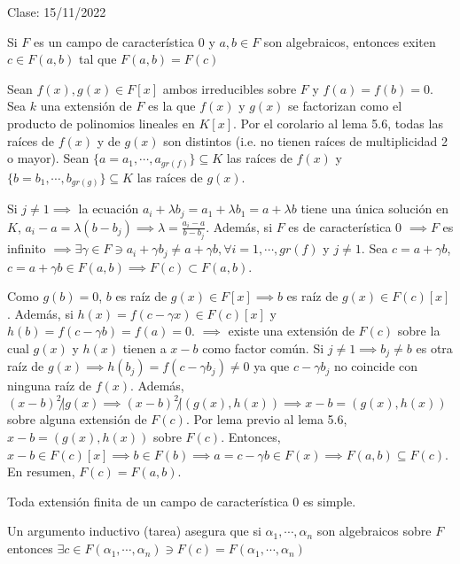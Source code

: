 Clase: 15/11/2022


\begin{teorema}[5K]
    Si $F$ es un campo de característica 0 y $a,b\in F$ son algebraicos, entonces exiten $c\in F(a,b)$ tal que $F(a,b)=F(c)$
    \begin{dem}
        Sean $f(x),g(x)\in F[x]$ ambos irreducibles sobre $F$ y $f(a)=f(b)=0$. Sea $k$ una extensión de $F$ es la que $f(x)$ y $g(x)$ se factorizan como el producto de polinomios lineales en $K[x]$. 
        Por el corolario al lema 5.6, todas las raíces de $f(x)$ y de $g(x)$ son distintos (i.e. no tienen raíces de multiplicidad 2 o mayor). Sean $\{a=a_1,\cdots, a_{gr(f)}\}\subseteq K$ las raíces de $f(x)$ y $\{b=b_1,\cdots, b_{gr(g)}\}\subseteq K$ las raíces de $g(x)$.\bigbreak

        Si $j\neq 1\implies$ la ecuación $a_i+\lambda b_j=a_1+\lambda b_1=a+\lambda b$ tiene una única solución en $K$, $a_i-a=\lambda(b-b_j)\implies \lambda = \frac{a_i-a}{b-b_j}$. 
        Además, si $F$ es de característica 0 $\implies F$ es infinito $\implies \exists \gamma\in F\ni a_i+\gamma b_j\neq a+\gamma b,\forall i=1,\cdots,gr(f)$ y $j\neq 1$. Sea $c=a+\gamma b$, $c=a+\gamma b\in F(a,b)\implies F(c)\subset F(a,b)$. 
        
        Como $g(b)=0$, $b$ es raíz de $g(x)\in F[x]\implies b$ es raíz de $g(x)\in F(c)[x]$. Además, si $h(x)=f(c-\gamma x)\in F(c)[x]$ y $h(b)=f(c-\gamma b)=f(a)=0$. $\implies$ existe una extensión de $F(c)$ sobre la cual $g(x)$ y $h(x)$ tienen a $x-b$ como factor común. 
        Si $j\neq 1\implies b_j\neq b$ es otra raíz de $g(x)\implies h(b_j)=f(c-\gamma b_j)\neq 0$ ya que $c-\gamma b_j$ no coincide con ninguna raíz de $f(x)$. Además, $(x-b)^2\not| g(x)\implies (x-b)^2\not| (g(x),h(x))\implies x-b=(g(x),h(x))$ sobre alguna extensión de $F(c)$. Por lema previo al lema 5.6, $x-b=(g(x),h(x))$ sobre $F(c)$. Entonces, $x-b\in F(c)[x]\implies b\in F(b)\implies a=c-\gamma b\in F(x)\implies F(a,b)\subseteq F(c)$. En resumen, $F(c)=F(a,b)$.  
    \end{dem}
\end{teorema}

\begin{corolario}
    Toda extensión finita de un campo de característica 0 es simple. 
    \begin{dem}
        Un argumento inductivo (tarea) asegura que si $\alpha_1,\cdots, \alpha_n$ son algebraicos sobre $F$ entonces $\exists c\in F(\alpha_1,\cdots, \alpha_n)\ni F(c)=F(\alpha_1,\cdots, \alpha_n)$
    \end{dem}
\end{corolario}

